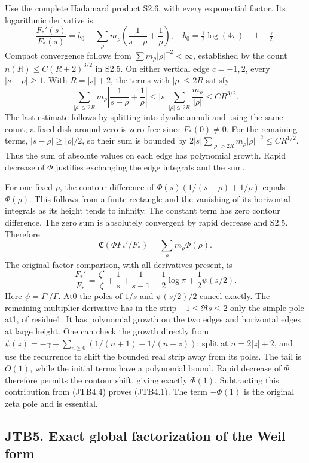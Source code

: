 Use the complete Hadamard product S2.6, with every exponential factor.
Its logarithmic derivative is \[
\frac{F_*'(s)}{F_*(s)}
=b_0+\sum_\rho m_\rho\left(\frac1{s-\rho}+\frac1\rho\right),
\quad b_0=\tfrac12\log(4\pi)-1-\tfrac\gamma2.
\tag{JTB4.2}
\] Compact convergence follows from \(\sum m_\rho|\rho|^{-2}<\infty\),
established by the count \(n(R)\le C(R+2)^{3/2}\) in S2.5. On either
vertical edge \(c=-1,2\), every \(|s-\rho|\ge1\). With \(R=|s|+2\), the
terms with \(|\rho|\le2R\) satisfy \[
\sum_{|\rho|\le2R}m_\rho
\left|\frac1{s-\rho}+\frac1\rho\right|
\le |s|\sum_{|\rho|\le2R}\frac{m_\rho}{|\rho|}
\le C R^{3/2}.
\tag{JTB4.3}
\] The last estimate follows by splitting into dyadic annuli and using
the same count; a fixed disk around zero is zero-free since
\(F_*(0)\ne0\). For the remaining terms, \(|s-\rho|\ge|\rho|/2\), so
their sum is bounded by
\(2|s|\sum_{|\rho|>2R}m_\rho|\rho|^{-2}\le C R^{1/2}\). Thus the sum of
absolute values on each edge has polynomial growth. Rapid decrease of
\(\Phi\) justifies exchanging the edge integrals and the sum.

For one fixed \(\rho\), the contour difference of
\(\Phi(s)(1/(s-\rho)+1/\rho)\) equals \(\Phi(\rho)\). This follows from
a finite rectangle and the vanishing of its horizontal integrals as its
height tends to infinity. The constant term has zero contour difference.
The zero sum is absolutely convergent by rapid decrease and S2.5.
Therefore \[
\mathfrak C(\Phi F_*'/F_*)=\sum_\rho m_\rho\Phi(\rho).
\tag{JTB4.4}
\] The original factor comparison, with all derivatives present, is \[
\frac{F_*'}{F_*}=
\frac{\zeta'}\zeta+\frac1s+\frac1{s-1}
-\frac12\log\pi+\frac12\psi(s/2).
\tag{JTB4.5}
\] Here \(\psi=\Gamma'/\Gamma\). At0 the poles of \(1/s\) and
\(\psi(s/2)/2\) cancel exactly. The remaining multiplier derivative has
in the strip \(-1\le\Re s\le2\) only the simple pole at1, of residue1.
It has polynomial growth on the two edges and horizontal edges at large
height. One can check the growth directly from
\(\psi(z)=-\gamma+\sum_{n\ge0}(1/(n+1)-1/(n+z))\): split at
\(n=2|z|+2\), and use the recurrence to shift the bounded real strip
away from its poles. The tail is \(O(1)\), while the initial terms have
a polynomial bound. Rapid decrease of \(\Phi\) therefore permits the
contour shift, giving exactly \(\Phi(1)\). Subtracting this contribution
from (JTB4.4) proves (JTB4.1). The term \(-\Phi(1)\) is the original
zeta pole and is essential.

\subsection{JTB5. Exact global factorization of the Weil
form}\label{jtb5.-exact-global-factorization-of-the-weil-form}

